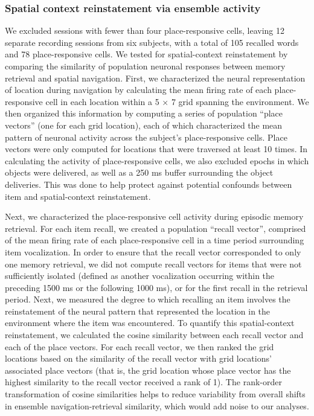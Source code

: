 \subsubsection*{Spatial context reinstatement via ensemble activity} 

We excluded sessions with fewer than four place-responsive cells, leaving 12 separate recording sessions from six subjects, with a total of 105 recalled words and 78 place-responsive cells. We tested for spatial-context reinstatement by comparing the similarity of population neuronal responses between memory retrieval and spatial navigation.  First, we characterized the neural representation of location during navigation by calculating the mean firing rate of each place-responsive cell in each location within a 5 $\times$ 7 grid spanning the environment. We then organized this information by computing a series of population ``place vectors'' (one for each grid location), each of which characterized the mean pattern of neuronal activity across the subject's place-responsive cells.  Place vectors were only computed for locations that were traversed at least 10 times.  In calculating the activity of place-responsive cells, we also excluded  epochs in which objects were delivered, as well as a 250 ms buffer surrounding the object deliveries.  This was done to help protect against potential confounds between item and spatial-context reinstatement.

Next, we characterized the place-responsive cell activity during episodic memory retrieval. For each item recall, we created a population ``recall vector'', comprised of the mean firing rate of each place-responsive cell in a time period surrounding item vocalization. In order to ensure that the recall vector corresponded to only one memory retrieval, we did not compute recall vectors for items that were not sufficiently isolated (defined as another vocalization occurring within the preceding 1500 ms or the following 1000 ms), or for the first recall in the retrieval period.  Next, we measured the degree to which recalling an item involves the reinstatement of the neural pattern that represented the location in the environment where the item was encountered.  To quantify this spatial-context reinstatement, we calculated the cosine similarity between each recall vector and each of the place vectors.  For each recall vector, we then ranked the grid locations based on the similarity of the recall vector with grid locations' associated place vectors (that is, the grid location whose place vector has the highest similarity to the recall vector received a rank of 1).  The rank-order transformation of cosine similarities helps to reduce variability from overall shifts in ensemble navigation-retrieval similarity, which would add noise to our analyses.

